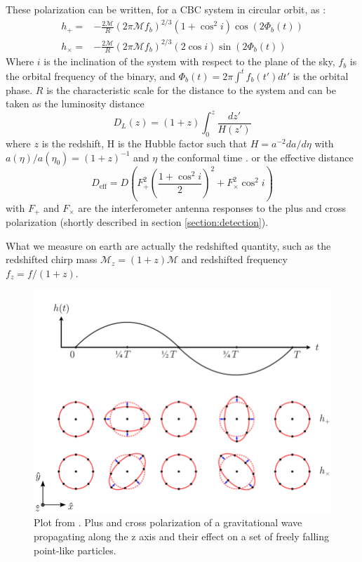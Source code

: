 These polarization can be written, for a CBC system in circular orbit, as \cite{Will_2014}:
%
\begin{equation}
  \begin{split}
    h_+ =& -\frac{2\mathcal{M}}{R} (2\pi \mathcal{M} f_b)^{2/3} (1+\cos^2 i) \cos(2\Phi_b (t))\\
    h_\times =& -\frac{2\mathcal{M}}{R} (2\pi \mathcal{M} f_b)^{2/3} (2\cos i) \sin(2\Phi_b (t))
  \end{split}
  \label{eq:polarization}
\end{equation}
%
Where $i$ is the inclination of the system with respect to the plane of the sky, $f_b$ is the orbital frequency of the binary, and $\Phi_b(t) = 2\pi \int^t f_b(t') dt'$ is the orbital phase.
$R$ is the characteristic scale for the distance to the system and can be taken as the luminosity distance
\begin{equation}
  D_L(z) = (1+z) \int_0^z \frac{dz'}{H(z')}
  \label{eq:luminosity_distance}
\end{equation}
where $z$ is the redshift, H is the Hubble factor such that $H = a^{-2} da/d\eta$ with $a(\eta)/a(\eta_0) = (1+z)^{-1}$ and $\eta$ the conformal time \cite{luminosity_distance}.
or the effective distance \cite{findchirp}
\begin{equation}
  D_{\textrm{eff}} = D \left( F_+^2 \left(\frac{1+\cos^2i}{2}\right)^2 +F_\times^2 \cos^2i \right)
  \label{eq:effective_distance}
\end{equation}
with $F_+$ and $F_\times$ are the interferometer antenna responses to the plus and cross polarization (shortly described in section \ref{section:detection}).

What we measure on earth are actually the redshifted quantity, such as the redshifted chirp mass $\mathcal{M}_z = (1+z) \mathcal{M}$ and redshifted frequency $f_z = f/(1+z)$.

% 
\begin{figure}
  \centering
  \includegraphics[width=0.5\linewidth]{sectionGW/polarization.png}
  \caption{Plot from \cite{polarization_novak}. Plus and cross polarization of a gravitational wave propagating along the z axis and their effect on a set of freely falling point-like particles.}
  \label{fig:polarization}
\end{figure}
%


